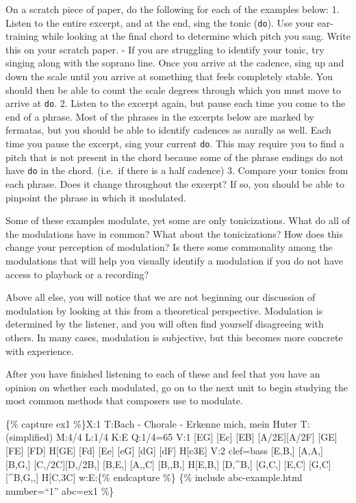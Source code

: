 \documentclass{book}
\begin{document}
On a scratch piece of paper, do the following for each of the examples below:
1. Listen to the entire excerpt, and at the end, sing the tonic (\texttt{do}).
Use your ear-training while looking at the final chord to determine which
pitch you sang. Write this on your scratch paper. - If you are struggling to
identify your tonic, try singing along with the soprano line. Once you arrive
at the cadence, sing up and down the scale until you arrive at something that
feels completely stable. You should then be able to count the scale degrees
through which you must move to arrive at \texttt{do}. 2. Listen to the excerpt
again, but pause each time you come to the end of a phrase. Most of the
phrases in the excerpts below are marked by fermatas, but you should be able
to identify cadences as aurally as well. Each time you pause the excerpt, sing
your current \texttt{do}. This may require you to find a pitch that is not
present in the chord because some of the phrase endings do not have
\texttt{do} in the chord. (i.e.~if there is a half cadence) 3. Compare your
tonics from each phrase. Does it change throughout the excerpt? If so, you
should be able to pinpoint the phrase in which it modulated.

Some of these examples modulate, yet some are only tonicizations. What do all
of the modulations have in common? What about the tonicizations? How does this
change your perception of modulation? Is there some commonality among the
modulations that will help you visually identify a modulation if you do not
have access to playback or a recording?

Above all else, you will notice that we are not beginning our discussion of
modulation by looking at this from a theoretical perspective. Modulation is
determined by the listener, and you will often find yourself disagreeing with
others. In many cases, modulation is subjective, but this becomes more
concrete with experience.

After you have finished listening to each of these and feel that you have an
opinion on whether each modulated, go on to the next unit to begin studying
the most common methods that composers use to modulate.

\{\% capture ex1 \%\}X:1 T:Bach - Chorale - Erkenne mich, mein Huter
T:(simplified) M:4/4 L:1/4 K:E Q:1/4=65 V:1 {[}EG{]}\textbar{} {[}Ec{]}
{[}EB{]} {[}A/2E{]}{[}A/2F{]} {[}GE{]}\textbar{} {[}FE{]} {[}FD{]} H{[}GE{]}
{[}Fd{]}\textbar{} {[}Ee{]} {[}eG{]} {[}dG{]} {[}dF{]}\textbar{}
H{[}c3E{]}\textbar{]} V:2 clef=bass {[}E,B,{]}\textbar{} {[}A,A,{]} {[}B,G,{]}
{[}C,/2C{]}{[}D,/2B,{]} {[}B,E,{]}\textbar{} {[}A,,C{]} {[}B,,B,{]}
H{[}E,B,{]} {[}D,\^{}B,{]}\textbar{} {[}G,C,{]} {[}E,C{]} {[}G,C{]}
{[}\^{}B,G,,{]}\textbar{} H{[}C,3C{]}\textbar{]} w:E:\{\% endcapture \%\} \{\%
include abc-example.html number=``1'' abc=ex1 \%\}
\end{document}
